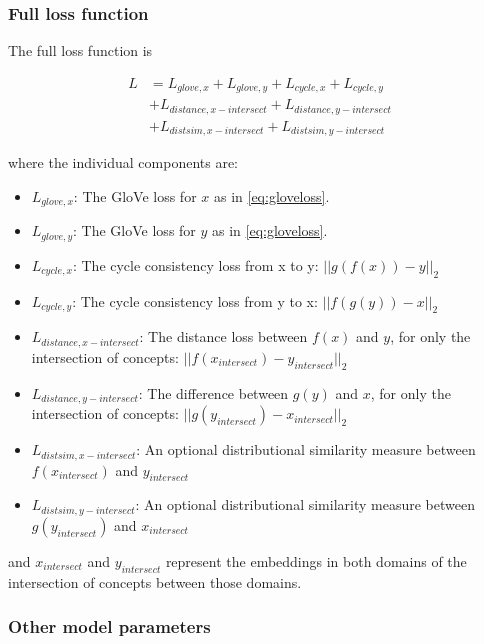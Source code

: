 
\subsubsection{Full loss function}


The full loss function is

\begin{equation}
\label{eq:fulllossfunction}
\begin{split}
L & = L_{glove, x} + L_{glove, y} + L_{cycle, x} + L_{cycle, y} \\
  & + L_{distance, x-intersect} + L_{distance, y-intersect} \\
  & + L_{distsim, x-intersect} + L_{distsim, y-intersect}
\end{split}
\end{equation}

where the individual components are: 

\begin{itemize}
    \item $L_{glove, x}$: The GloVe loss for $x$ as in \ref{eq:gloveloss}. 
    \item $L_{glove, y}$: The GloVe loss for $y$ as in \ref{eq:gloveloss}. 
    \item $L_{cycle, x}$: The cycle consistency loss from x to y: $||g(f(x)) - y||_2$
    \item $L_{cycle, y}$: The cycle consistency loss from y to x: $||f(g(y)) - x||_2$
    \item $L_{distance, x-intersect}$: The distance loss between $f(x)$ and $y$, for only the intersection of concepts: $||f(x_{intersect}) - y_{intersect}||_2$
    \item $L_{distance, y-intersect}$: The difference between $g(y)$ and $x$, for only the intersection of concepts: $||g(y_{intersect}) - x_{intersect}||_2$
    \item $L_{distsim, x-intersect}$: An optional distributional similarity measure between $f(x_{intersect})$ and $y_{intersect}$
    \item $L_{distsim, y-intersect}$: An optional distributional similarity measure between $g(y_{intersect})$ and $x_{intersect}$
\end{itemize}

and $x_{intersect}$ and $y_{intersect}$ represent the embeddings in both domains of the intersection of concepts between those domains. 

\subsubsection{Other model parameters}

